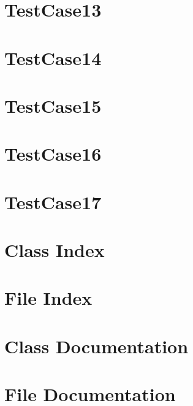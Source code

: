 \documentclass[twoside]{article}
\newcommand{\+}{\discretionary{\mbox{\scriptsize$\hookleftarrow$}}{}{}}
\begin{document}
\section{Test\+Case13}
\label{TestCase13}
\hypertarget{TestCase13}{}

\section{Test\+Case14}
\label{TestCase14}
\hypertarget{TestCase14}{}

\section{Test\+Case15}
\label{TestCase15}
\hypertarget{TestCase15}{}

\section{Test\+Case16}
\label{TestCase16}
\hypertarget{TestCase16}{}

\section{Test\+Case17}
\label{TestCase17}
\hypertarget{TestCase17}{}

\section{Class Index}

\section{File Index}

\section{Class Documentation}


\section{File Documentation}







\newpage
{}
{}
\printindex
\end{document}
